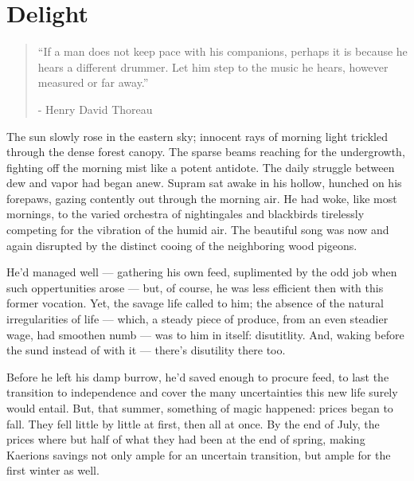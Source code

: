 \chapter{Delight}

\vspace{-1.3cm}
\begin{localsize}{10}
	\begin{quote}
		“If a man does not keep pace with his companions, perhaps it is because he hears a different drummer. Let him step to the music he hears, however measured or far away.”
		\begin{flushright}- Henry David Thoreau \end{flushright}
	\end{quote} 
\end{localsize}
\vspace{1cm}





The sun slowly rose in the eastern sky; innocent rays of morning light trickled through the dense forest canopy. The sparse beams reaching for the undergrowth, fighting off the morning mist like a potent antidote. The daily struggle between dew and vapor had began anew. Supram sat awake in his hollow, hunched on his forepaws, gazing contently out through the morning air. He had woke, like most mornings, to the varied orchestra of nightingales and blackbirds tirelessly competing for the vibration of the humid air. The beautiful song was now and again disrupted by the distinct cooing of the neighboring wood pigeons. 
  
He'd managed well — gathering his own feed, suplimented by the odd job when such oppertunities arose — but, of course, he was less efficient then with this former vocation. Yet, the savage life called to him; the absence of the natural irregularities of life — which, a steady piece of produce, from an even steadier wage, had smoothen numb — was to him in itself: disutitlity. And, waking before the sund instead of with it — there's disutility there too.

  Before he left his damp burrow, he'd saved enough to procure feed, to last the transition to independence and cover the many uncertainties this new life surely would entail. But, that summer, something of magic happened: prices began to fall. They fell little by little at first, then all at once. By the end of July, the prices where but half of what they had been at the end of spring, making Kaerions savings not only ample for an uncertain transition, but ample for the first winter as well.

